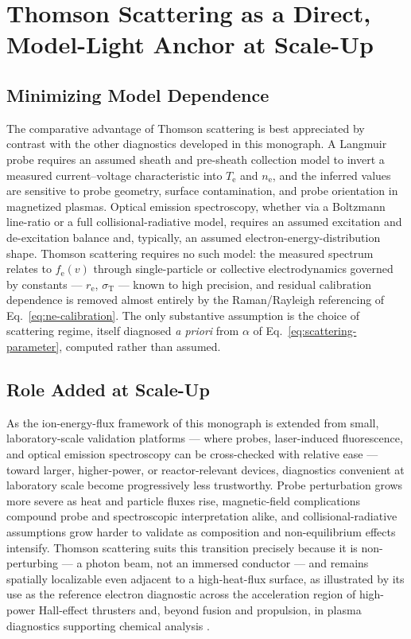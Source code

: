 \section{Thomson Scattering as a Direct, Model-Light Anchor at Scale-Up}

\subsection{Minimizing Model Dependence}

The comparative advantage of Thomson scattering is best appreciated by contrast with the other diagnostics developed in this monograph. A Langmuir probe requires an assumed sheath and pre-sheath collection model to invert a measured current--voltage characteristic into $T_{\mathrm{e}}$ and $n_{\mathrm{e}}$, and the inferred values are sensitive to probe geometry, surface contamination, and probe orientation in magnetized plasmas. Optical emission spectroscopy, whether via a Boltzmann line-ratio or a full collisional-radiative model, requires an assumed excitation and de-excitation balance and, typically, an assumed electron-energy-distribution shape. Thomson scattering requires no such model: the measured spectrum relates to $f_{\mathrm{e}}(v)$ through single-particle or collective electrodynamics governed by constants — $r_{\mathrm{e}}$, $\sigma_{\mathrm{T}}$ — known to high precision, and residual calibration dependence is removed almost entirely by the Raman/Rayleigh referencing of Eq.~\eqref{eq:ne-calibration}. The only substantive assumption is the choice of scattering regime, itself diagnosed \emph{a priori} from $\alpha$ of Eq.~\eqref{eq:scattering-parameter}, computed rather than assumed.

\subsection{Role Added at Scale-Up}

As the ion-energy-flux framework of this monograph is extended from small, laboratory-scale validation platforms — where probes, laser-induced fluorescence, and optical emission spectroscopy can be cross-checked with relative ease — toward larger, higher-power, or reactor-relevant devices, diagnostics convenient at laboratory scale become progressively less trustworthy. Probe perturbation grows more severe as heat and particle fluxes rise, magnetic-field complications compound probe and spectroscopic interpretation alike, and collisional-radiative assumptions grow harder to validate as composition and non-equilibrium effects intensify. Thomson scattering suits this transition precisely because it is non-perturbing — a photon beam, not an immersed conductor — and remains spatially localizable even adjacent to a high-heat-flux surface, as illustrated by its use as the reference electron diagnostic across the acceleration region of high-power Hall-effect thrusters \cite{ref0356,ref0355} and, beyond fusion and propulsion, in plasma diagnostics supporting chemical analysis \cite{ref0354}.

